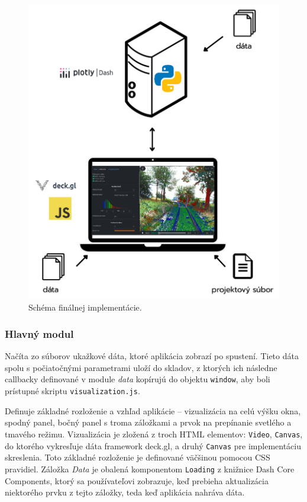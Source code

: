 \begin{figure}[t]
    \centering
    \includegraphics[width=0.7\linewidth]{text_prace/obrazky-figures/schema_implementacie.pdf}
    \caption{Schéma finálnej implementácie.}
    \label{fig:schema_implementacie}
\end{figure}

\subsubsection{Hlavný modul }

Načíta zo súborov ukažkové dáta, ktoré aplikácia zobrazí po spustení. Tieto dáta spolu s počiatočnými parametrami uloží do skladov, z ktorých ich následne callbacky definované v module \emph{data} kopírujú do objektu \texttt{window}, aby boli prístupné skriptu \texttt{visualization.js}.

Definuje základné rozloženie a vzhľad aplikácie -- vizualizácia na celú výšku okna, spodný panel, bočný panel s troma záložkami a prvok na prepínanie svetlého a tmavého režimu. Vizualizácia je zložená z troch HTML elementov: \texttt{Video}, \texttt{Canvas}, do ktorého vykresľuje dáta framework deck.gl, a druhý \texttt{Canvas} pre implementáciu skreslenia. Toto základné rozloženie je definované väčšinou pomocou CSS pravidiel. Záložka \emph{Data} je obalená komponentom \texttt{Loading} z knižnice Dash Core Components, ktorý sa používateľovi zobrazuje, keď prebieha aktualizácia niektorého prvku z tejto záložky, teda keď aplikácia nahráva dáta.

